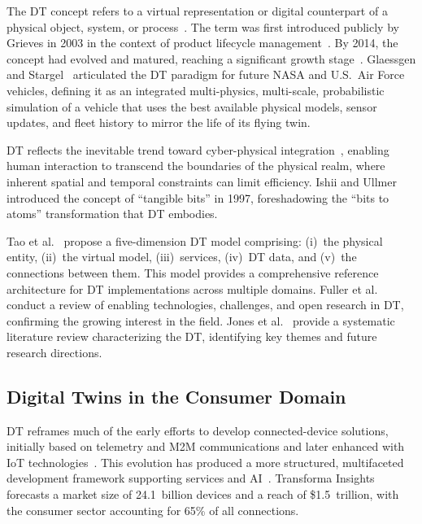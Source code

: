 \noindent The \ac{DT} concept refers to a virtual representation or digital counterpart of a physical object, system, or process~\cite{minerva:lee:crespi:2020}.
The term was first introduced publicly by Grieves in 2003 in the context of product lifecycle management~\cite{grieves:2014}.
By 2014, the concept had evolved and matured, reaching a significant growth stage~\cite{grieves:vickers:2017}.
Glaessgen and Stargel~\cite{glaessgen:stargel:2012} articulated the \ac{DT} paradigm for future NASA and U.S.\ Air Force vehicles, defining it as an integrated multi-physics, multi-scale, probabilistic simulation of a vehicle that uses the best available physical models, sensor updates, and fleet history to mirror the life of its flying twin.

\ac{DT} reflects the inevitable trend toward cyber-physical integration~\cite{minerva:lee:crespi:2020}, enabling human interaction to transcend the boundaries of the physical realm, where inherent spatial and temporal constraints can limit efficiency.
Ishii and Ullmer~\cite{ishii:ullmer:1997} introduced the concept of ``tangible bits'' in 1997, foreshadowing the ``bits to atoms'' transformation that \ac{DT} embodies.

Tao et al.~\cite{tao:zhang:liu:nee:2019} propose a five-dimension \ac{DT} model comprising: (i)~the physical entity, (ii)~the virtual model, (iii)~services, (iv)~\ac{DT} data, and (v)~the connections between them.
This model provides a comprehensive reference architecture for \ac{DT} implementations across multiple domains.
Fuller et al.~\cite{fuller:fan:day:barlow:2020} conduct a review of enabling technologies, challenges, and open research in \ac{DT}, confirming the growing interest in the field.
Jones et al.~\cite{jones:snider:nassehi:yon:hicks:2020} provide a systematic literature review characterizing the \ac{DT}, identifying key themes and future research directions.

\subsection{Digital Twins in the Consumer Domain}
\label{subsec:dt-consumer}

\ac{DT} reframes much of the early efforts to develop connected-device solutions, initially based on telemetry and \ac{M2M} communications and later enhanced with \ac{IoT} technologies~\cite{madakam:ramaswamy:tripathi:2015}.
This evolution has produced a more structured, multifaceted development framework supporting services and \ac{AI}~\cite{minerva:lee:crespi:2020}.
Transforma Insights~\cite{transforma:insights:2021} forecasts a market size of 24.1~billion devices and a reach of \$1.5~trillion, with the consumer sector accounting for 65\% of all connections.

